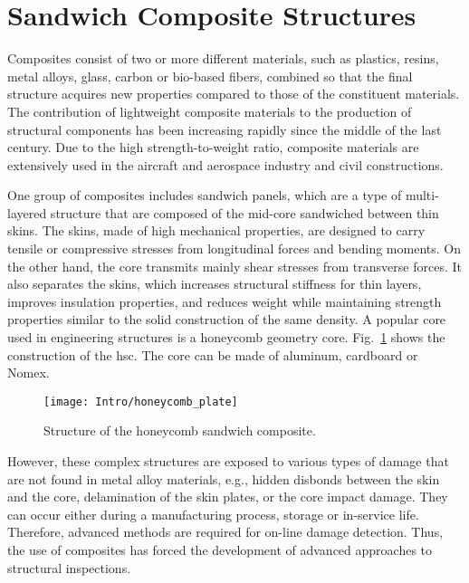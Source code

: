 \section{Sandwich Composite Structures}
\label{sec:scs}

Composites consist of two or more different materials, such as plastics, resins, metal alloys, glass, carbon or bio-based fibers, combined so that the final structure acquires new properties compared to those of the constituent materials.
The contribution of lightweight composite materials to the production of structural components has been increasing rapidly since the middle of the last century.
Due to the high strength-to-weight ratio, composite materials are extensively used in the aircraft and aerospace industry and civil constructions.

One group of composites includes sandwich panels, which are a type of multi-layered structure that are composed of the mid-core sandwiched between thin skins.
The skins, made of high mechanical properties, are designed to carry tensile or compressive stresses from longitudinal forces and bending moments.
On the other hand, the core transmits mainly shear stresses from transverse forces.
It also separates the skins, which increases structural stiffness for thin layers, improves insulation properties, and reduces weight while maintaining strength properties similar to the solid construction of the same density.
A popular core used in engineering structures is a honeycomb geometry core.
Fig.~\ref{fig:hcp} shows the construction of the \ac{hsc}.
The core can be made of aluminum, cardboard or Nomex. 
\begin{figure}[H] %
	\begin{center}
		\texttt{[image: Intro/honeycomb\_plate]} \caption{
			\label{fig:hcp} Structure of the honeycomb sandwich composite.}
		\vspace{-0.5cm}
	\end{center}
\end{figure}

However, these complex structures are exposed to various types of damage that are not found in metal alloy materials, e.g., hidden disbonds between the skin and the core, delamination of the skin plates, or the core impact damage.
They can occur either during a manufacturing process, storage or in-service life.
Therefore, advanced methods are required for on-line damage detection.
Thus, the use of composites has forced the development of advanced approaches to structural inspections.